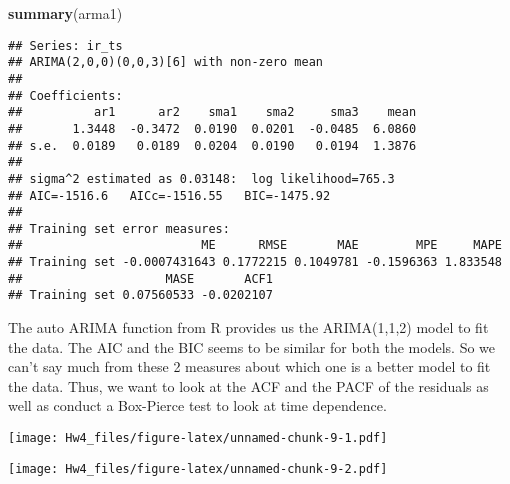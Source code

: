 \documentclass[]{article}
\newenvironment{Shaded}{\begin{snugshade}}{\end{snugshade}}
\newcommand{\KeywordTok}[1]{\textcolor[rgb]{0.13,0.29,0.53}{\textbf{#1}}}
\newcommand{\DataTypeTok}[1]{\textcolor[rgb]{0.13,0.29,0.53}{#1}}
\newcommand{\DecValTok}[1]{\textcolor[rgb]{0.00,0.00,0.81}{#1}}
\newcommand{\StringTok}[1]{\textcolor[rgb]{0.31,0.60,0.02}{#1}}
\newcommand{\OperatorTok}[1]{\textcolor[rgb]{0.81,0.36,0.00}{\textbf{#1}}}
\newcommand{\NormalTok}[1]{#1}
\begin{document}
\begin{Shaded}
\begin{Highlighting}[]
\KeywordTok{summary}\NormalTok{(arma1)}
\end{Highlighting}
\end{Shaded}

\begin{verbatim}
## Series: ir_ts 
## ARIMA(2,0,0)(0,0,3)[6] with non-zero mean 
## 
## Coefficients:
##          ar1      ar2    sma1    sma2     sma3    mean
##       1.3448  -0.3472  0.0190  0.0201  -0.0485  6.0860
## s.e.  0.0189   0.0189  0.0204  0.0190   0.0194  1.3876
## 
## sigma^2 estimated as 0.03148:  log likelihood=765.3
## AIC=-1516.6   AICc=-1516.55   BIC=-1475.92
## 
## Training set error measures:
##                         ME      RMSE       MAE        MPE     MAPE
## Training set -0.0007431643 0.1772215 0.1049781 -0.1596363 1.833548
##                    MASE       ACF1
## Training set 0.07560533 -0.0202107
\end{verbatim}

The auto ARIMA function from R provides us the ARIMA(1,1,2) model to fit
the data. The AIC and the BIC seems to be similar for both the models.
So we can't say much from these 2 measures about which one is a better
model to fit the data. Thus, we want to look at the ACF and the PACF of
the residuals as well as conduct a Box-Pierce test to look at time
dependence.

\begin{Shaded}
\end{Shaded}

\texttt{[image: Hw4\_files/figure-latex/unnamed-chunk-9-1.pdf]}

\begin{Shaded}
\end{Shaded}

\texttt{[image: Hw4\_files/figure-latex/unnamed-chunk-9-2.pdf]}

\begin{Shaded}
\end{Shaded}
\end{document}

